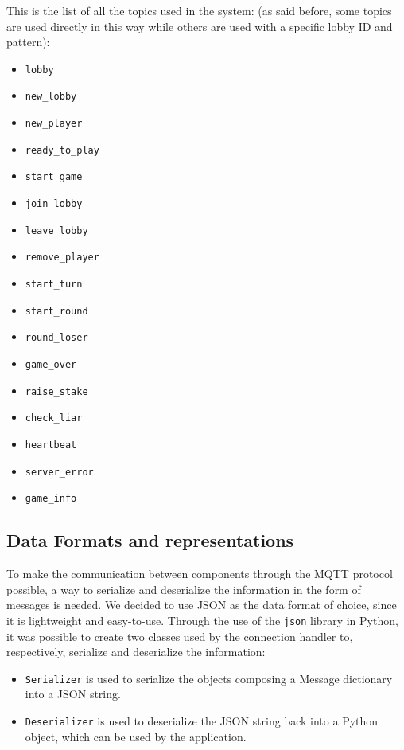 \documentclass{scrartcl}
\begin{document}
This is the list of all the topics used in the system: (as said before, some topics are used directly 
in this way while others are used with a specific lobby ID and pattern):
\begin{itemize}
      \item \texttt{lobby}
      \item \texttt{new\_lobby}
      \item \texttt{new\_player}
      \item \texttt{ready\_to\_play}
      \item \texttt{start\_game}
      \item \texttt{join\_lobby}
      \item \texttt{leave\_lobby}
      \item \texttt{remove\_player}
      \item \texttt{start\_turn}
      \item \texttt{start\_round}
      \item \texttt{round\_loser}
      \item \texttt{game\_over}
      \item \texttt{raise\_stake}
      \item \texttt{check\_liar}
      \item \texttt{heartbeat}
      \item \texttt{server\_error}
      \item \texttt{game\_info}
\end{itemize}

\subsection{Data Formats and representations}\label{data-formats}
To make the communication between components through the MQTT protocol possible, a way to serialize
and deserialize the information in the form of messages is needed.
We decided to use JSON as the data format of choice, since it is lightweight and easy-to-use.
Through the use of the \texttt{json} library in Python, it was possible to create two classes used
by the connection handler to, respectively, serialize and deserialize the information:
\begin{itemize}
      \item \texttt{Serializer} is used to serialize the objects composing a Message dictionary into a 
            JSON string.
      \item \texttt{Deserializer} is used to deserialize the JSON string back into a Python
            object, which can be used by the application.
\end{itemize}
\end{document}

